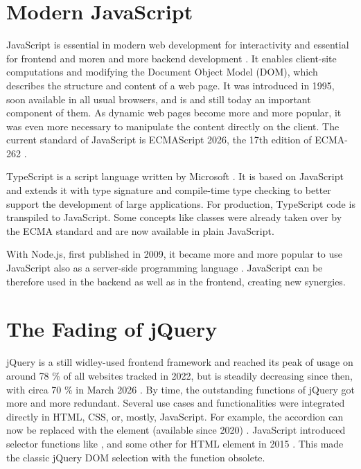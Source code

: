 \section{Modern JavaScript}

JavaScript is essential in modern web development for interactivity and
essential for frontend and moren and more backend development
\parencite{shukla-jsfullstack}. It enables client-site computations and
modifying the Document Object Model (DOM), which describes the structure
and content of a web page. It was introduced in 1995, soon available in
all usual browsers, and is and still today an important component of
them. As dynamic web pages become more and more popular, it was even
more necessary to manipulate the content directly on the client.
The current standard of JavaScript is ECMAScript 2026, the 17th edition
of ECMA-262 \parencite{ecma2026}.

TypeScript is a script language written by Microsoft
\parencite{typescript}. It is based on JavaScript and extends it with
type signature and compile-time type checking to better support the
development of large applications. For production, TypeScript code is
transpiled to JavaScript. Some concepts like classes were already taken
over by the ECMA standard and are now available in plain JavaScript.

With Node.js, first published in 2009, it became more and more popular
to use JavaScript also as a server-side programming language
\parencite{nodejs}. JavaScript can be therefore used in the backend as
well as in the frontend, creating new synergies.
%




\section{The Fading of jQuery}

jQuery is a still widley-used frontend framework and reached its peak of
usage on around 78 \% of all websites tracked in 2022, but is steadily
decreasing since then, with circa 70 \% in March 2026
\parencite{w3techs-js-statistics}. By time, the outstanding functions of
jQuery got more and more redundant. Several use cases and
functionalities were integrated directly in HTML, CSS, or, mostly,
JavaScript. For example, the accordion can now be replaced with the
 element (available since 2020)
\parencite{mdn-html-details}. JavaScript introduced selector functions
like ,  and some other
for HTML element in 2015 \parencite{mdn-js-queryselector}. This made the
classic jQuery DOM selection with the {\vname{\$()}} function obsolete.




